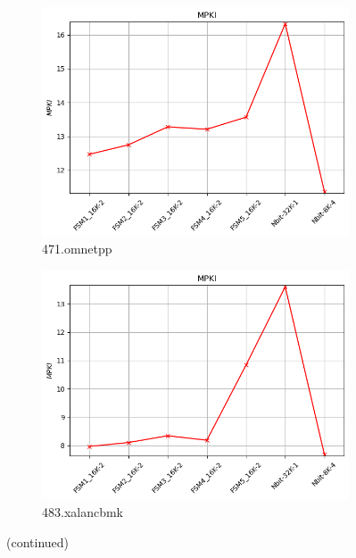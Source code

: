 \documentclass{article}
\begin{document}
\begin{figure}
    \vspace{0.5cm} %

    \begin{subfigure}[b]{0.45\textwidth}
        \includegraphics[width=\textwidth]{figures/5_3_c/471.omnetpp.cslab_branch_preds_ref.out.png}
        \caption{471.omnetpp}
        \label{fig:plot47}
    \end{subfigure}
    \hfill
    \begin{subfigure}[b]{0.45\textwidth}
        \includegraphics[width=\textwidth]{figures/5_3_c/483.xalancbmk.cslab_branch_preds_ref.out.png}
        \caption{483.xalancbmk}
        \label{fig:plot48}        
    \end{subfigure}
    \vspace{0.5cm}

    \caption{(continued)}
    \label{fig:32K_part3}
\end{figure}













 
\end{document}
